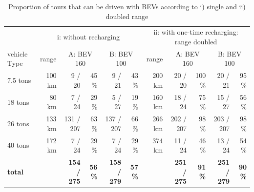 \begin{table}[b]
	\caption{Proportion of tours that can be driven with BEVs according to i) single and ii) doubled range}
	\begin{tabular*}{\hsize}{@{\extracolsep{\fill}}l|rrrrr||rrrrr}
		& \multicolumn{5}{c}{i: without recharging} &  \multicolumn{5}{c}{ii: with one-time recharging: range doubled} \\
		
		vehicle Type & range & \multicolumn{2}{c}{A: BEV 160} & \multicolumn{2}{c}{B: BEV 100}  &  range &  \multicolumn{2}{c}{A: BEV 160} & \multicolumn{2}{c}{B: BEV 100} \\
		\midrule
		
		7.5 tons & 100 km & 9 / 20 & 45 \%  &  9 / 21 & 43 \% & 200 km & 20 / 20 & 100 \% & 20 / 21  & 95 \% \\
		
		18 tons & 80 km & 7 / 24  & 29 \%  &  5 / 27  & 19 \% & 160 km & 18 / 24 & 75 \% &  15 / 27  & 56 \%\\
		
		26 tons & 133 km & 131 / 207 & 63 \%  &  137 / 207 & 66 \% & 266 km & 202 / 207 & 98 \% & 203 / 207 & 98 \% \\
		
		40 tons & 172 km & 7 / 24 & 29 \%  &  7 / 24  & 29 \% & 374 km & 11 / 24 & 46 \%  & 13 / 24 & 54 \%\\
		\hline
		\textbf{total} &  & \textbf{154 / 275} & \textbf{56 \%} & \textbf{158 / 279} & \textbf{57 \%} &  & \textbf{251 / 275} & \textbf{91 \%} & \textbf{251 / 279}  & \textbf{90 \%}\\
		
	\end{tabular*}
	\label{tab:resultsDistances}
\end{table}

